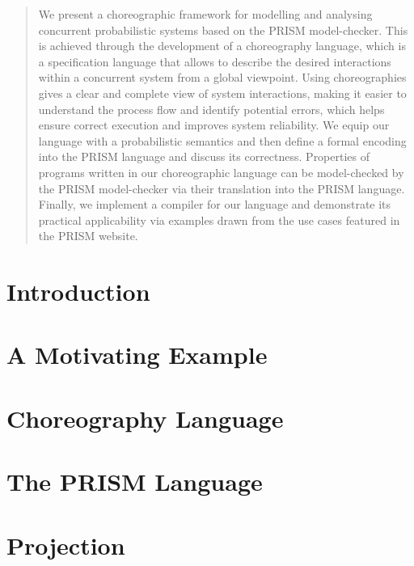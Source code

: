 \documentclass{lmcs} %
\theoremstyle{plain}\newtheorem{satz}[thm]{Satz} %
\begin{document}
\begin{abstract}
  \noindent We present a choreographic framework for modelling and
  analysing concurrent probabilistic systems based on the PRISM
  model-checker. This is achieved through the development of a
  choreography language, which is a specification language that allows
  to describe the desired interactions within a concurrent system from
  a global viewpoint. Using choreographies gives a clear and complete
  view of system interactions, making it easier to understand the
  process flow and identify potential errors, which helps ensure
  correct execution and improves system reliability. We equip our
  language with a probabilistic semantics and then define a formal
  encoding into the PRISM language and discuss its
  correctness. Properties of programs written in our choreographic
  language can be model-checked by the PRISM model-checker via their
  translation into the PRISM language.  Finally, we implement a
  compiler for our language and demonstrate its practical
  applicability via examples drawn from the use cases featured in the
  PRISM website.
\end{abstract}

\maketitle

\section{Introduction}\label{sec:intro}


\section{A Motivating Example}\label{sec:example}


\section{Choreography Language}\label{sec:chor}


\section{The PRISM Language}\label{sec:prism}


\section{Projection}\label{sec:proj}

\end{document}
